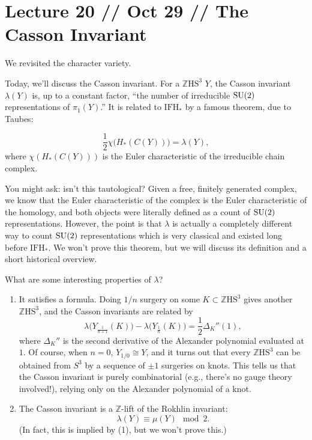 \documentclass[main]{subfiles}
\begin{document}
\section*{Lecture 20 // Oct 29 // The Casson Invariant}

\begin{recall}
We revisited the character variety.
\end{recall}

Today, we'll discuss the Casson invariant. For a $\mathbb{Z}\mathrm{HS}^3$ $Y$, the Casson invariant $\lambda(Y)$ is, up to a constant factor, ``the number of irreducible $\operatorname{SU}(2)$ representations of $\pi_1(Y)$.'' It is related to $\mathrm{IFH}_\ast$ by a famous theorem, due to Taubes:

\begin{theorem}[Taubes]
\[
\frac{1}{2}\chi\big(H_\ast(C(Y))\big) = \lambda(Y),
\]
where $\chi(H_\ast(C(Y)))$ is the Euler characteristic of the irreducible chain complex.
\end{theorem}

You might ask: isn't this tautological? Given a free, finitely generated complex, we know that the Euler characteristic of the complex is the Euler characteristic of the homology, and both objects were literally defined as a count of $\operatorname{SU}(2)$ representations. However, the point is that $\lambda$ is actually a completely different way to count $\operatorname{SU}(2)$ representations which is very classical and existed long before $\mathrm{IFH}_\ast$. We won't prove this theorem, but we will discuss its definition and a short historical overview.

What are some interesting properties of $\lambda$?
\begin{enumerate}
\item It satisfies a formula. Doing $1/n$ surgery on some $K\subset\mathbb{Z}\mathrm{HS}^3$ gives another $\mathbb{Z}\mathrm{HS}^3$, and the Casson invariants are related by
\[
\lambda\big(Y_{\frac{1}{n+1}}(K)\big) - \lambda\big(Y_{\frac{1}{n}}(K)\big) = \frac{1}{2}\Delta_K''(1),
\]
where $\Delta_K''$ is the second derivative of the Alexander polynomial evaluated at $1$. Of course, when $n=0$, $Y_{1/0}\cong Y$, and it turns out that every $\mathbb{Z}\mathrm{HS}^3$ can be obtained from $S^3$ by a sequence of $\pm 1$ surgeries on knots. This tells us that the Casson invariant is purely combinatorial (e.g., there's no gauge theory involved!), relying only on the Alexander polynomial of a knot.

\item The Casson invariant is a $\mathbb{Z}$-lift of the Rokhlin invariant:
\[
\lambda(Y) \equiv \mu(Y) \mod 2.
\]
(In fact, this is implied by (1), but we won't prove this.)
\end{enumerate}
\end{document}
